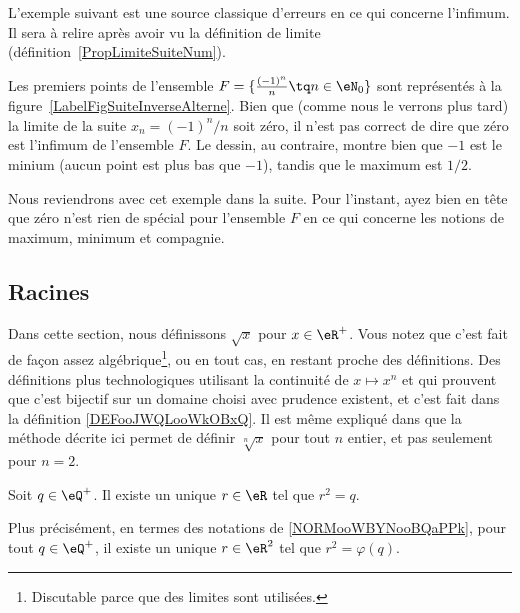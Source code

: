 \newcommand{\CaptionFigSuiteUnSurn}{Les premiers points du type $x_n=1/n$.}


L'exemple suivant est une source classique d'erreurs en ce qui concerne l'infimum. Il sera à relire après avoir vu la définition de limite (définition~\ref{PropLimiteSuiteNum}).

\begin{example}
	Les premiers points de l'ensemble $F=\{ \frac{ (-1)^n }{ n }\tq n\in\eN_0 \}$ sont représentés à la figure~\ref{LabelFigSuiteInverseAlterne}. Bien que (comme nous le verrons plus tard) la limite de la suite $x_n=(-1)^n/n$ soit zéro, il n'est pas correct de dire que zéro est l'infimum de l'ensemble $F$. Le dessin, au contraire, montre bien que $-1$ est le minium (aucun point est plus bas que $-1$), tandis que le maximum est $1/2$.

	Nous reviendrons avec cet exemple dans la suite. Pour l'instant, ayez bien en tête que zéro n'est rien de spécial pour l'ensemble $F$ en ce qui concerne les notions de maximum, minimum et compagnie.
\end{example}
\newcommand{\CaptionFigSuiteInverseAlterne}{Les quelques premiers points du type $(-1)^n/n$.}


\subsection{Racines}
\label{SUBSECooMBCNooEqjjTY}

Dans cette section, nous définissons \( \sqrt{ x }\) pour \( x\in\eR^+\). Vous notez que c'est fait de façon assez algébrique\footnote{Discutable parce que des limites sont utilisées.}, ou en tout cas, en restant proche des définitions. Des définitions plus technologiques utilisant la continuité de \( x\mapsto x^n\) et qui prouvent que c'est bijectif sur un domaine choisi avec prudence existent, et c'est fait dans la définition \ref{DEFooJWQLooWkOBxQ}. Il est même expliqué dans \cite{BIBooMPXEooQLKhku} que la méthode décrite ici permet de définir \( \sqrt[n]{ x }\) pour tout \( n\) entier, et pas seulement pour \( n=2\).

\begin{proposition}     \label{PROPooUHKFooVKmpte}
    Soit \( q\in \eQ^+\). Il existe un unique \( r\in \eR\) tel que \( r^2=q\).
    
    Plus précisément, en termes des notations de \ref{NORMooWBYNooBQaPPk}, pour tout \( q\in \eQ^+\), il existe un unique \( r\in \eR^2\) tel que \( r^2=\varphi(q)\).
\end{proposition}

